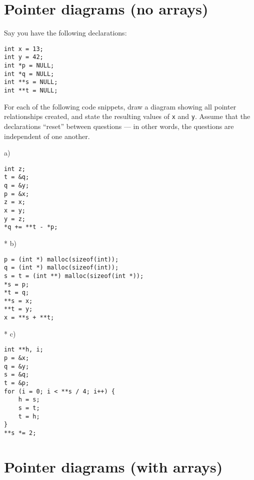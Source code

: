 \documentclass[a4paper,12pt]{article}
\begin{document}
\newpage

\section{Pointer diagrams (no arrays)}

Say you have the following declarations:

\begin{lstlisting}
int x = 13;
int y = 42;
int *p = NULL;
int *q = NULL;
int **s = NULL;
int **t = NULL;
\end{lstlisting}

For each of the following code snippets, draw a diagram showing all
pointer relationships created, and state the resulting values of
\texttt{x} and \texttt{y}. Assume that the declarations ``reset''
between questions --- in other words, the questions are independent of
one another.

a)


\begin{lstlisting}
int z;
t = &q;
q = &y;
p = &x;
z = x;
x = y;
y = z;
*q += **t - *p;
\end{lstlisting}

* b)


\begin{lstlisting}
p = (int *) malloc(sizeof(int));
q = (int *) malloc(sizeof(int));
s = t = (int **) malloc(sizeof(int *));
*s = p;
*t = q;
**s = x;
**t = y;
x = **s + **t;
\end{lstlisting}

* c)


\begin{lstlisting}
int **h, i;
p = &x;
q = &y;
s = &q;
t = &p;
for (i = 0; i < **s / 4; i++) {
	h = s;
	s = t;
	t = h;
}
**s *= 2;
\end{lstlisting}

\newpage

\section{Pointer diagrams (with arrays)}
\end{document}

